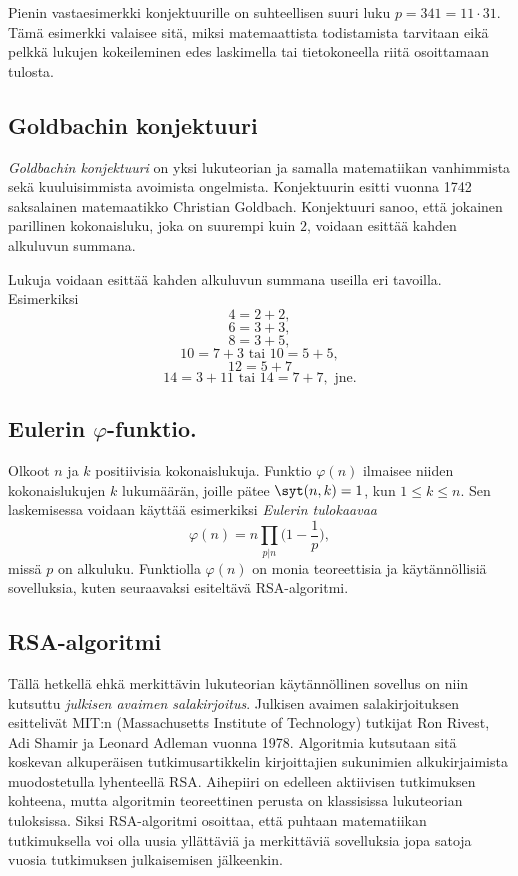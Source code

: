 Pienin vastaesimerkki konjektuurille on suhteellisen suuri luku $p=341 = 11\cdot 31$. Tämä esimerkki valaisee sitä, miksi matemaattista todistamista tarvitaan eikä pelkkä lukujen kokeileminen edes laskimella tai tietokoneella riitä osoittamaan tulosta.


\subsection*{Goldbachin konjektuuri}
{\em Goldbachin konjektuuri} on yksi lukuteorian ja samalla matematiikan vanhimmista sekä kuuluisimmista avoimista ongelmista. Konjektuurin esitti vuonna 1742 saksalainen mate\-maa\-tik\-ko Christian Goldbach. Konjektuuri sanoo, että jokainen parillinen kokonaisluku, joka on suurempi kuin $2$, voidaan esittää kahden alkuluvun summana. 

Lukuja voidaan esittää kahden alkuluvun summana useilla eri tavoilla. Esimerkiksi
\[
  4 = 2 + 2,
\]
\[
  6 = 3 + 3,
\]
\[
  8 = 3 + 5,
\]
\[
10 = 7 + 3\textrm{ tai } 10=5 + 5,
\]
\[
12 = 5 + 7
\]
\[
14 = 3 + 11\textrm{ tai }14 =7 + 7, \textrm{ jne.}
\]

\subsection*{Eulerin $\varphi$-funktio.} 
Olkoot $n$ ja $k$ positiivisia kokonaislukuja. Funktio $\varphi(n)$ ilmaisee niiden kokonaislukujen $k$ lukumäärän, joille pätee 
$\syt(n, k) = 1$, kun $1\le k \le n$. Sen laskemisessa voidaan käyttää esimerkiksi {\em Eulerin tulokaavaa}
\[
\varphi(n)=n \prod_{p|n} \bigg(1-\frac{1}{p}\bigg),
\]
missä $p$ on alkuluku. Funktiolla $\varphi(n)$ on monia teoreettisia ja käy\-tän\-nöl\-li\-siä sovelluksia, kuten seuraavaksi esiteltävä RSA-algoritmi.

\subsection*{RSA-algoritmi} Tällä hetkellä ehkä merkittävin lukuteorian käy\-tän\-nöl\-li\-nen sovellus on niin kutsuttu {\em julkisen avaimen salakirjoitus}. Julkisen avaimen salakirjoituksen esittelivät MIT:n (Massachusetts Institute of Technology) tutkijat Ron Rivest, Adi Shamir ja Leonard Adleman vuonna 1978. Algoritmia kutsutaan sitä koskevan alkuperäisen tutkimusartikkelin kirjoittajien sukunimien alkukirjaimista muodostetulla lyhenteellä RSA. Aihepiiri on edelleen aktiivisen tutkimuksen kohteena, mutta algoritmin teoreettinen perusta on klassisissa lukuteorian tuloksissa. Siksi RSA-algoritmi osoittaa, että puhtaan matematiikan tutkimuksella voi olla uusia yllättäviä ja merkittäviä sovelluksia jopa satoja vuosia tutkimuksen julkaisemisen jälkeenkin.

